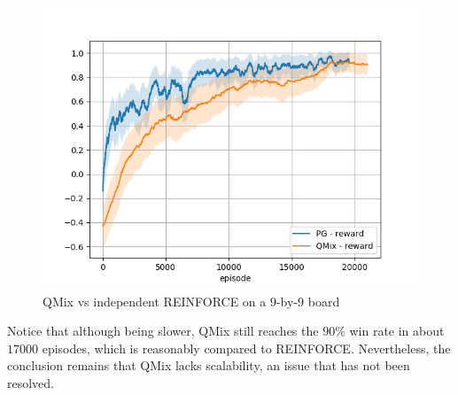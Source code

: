 \begin{figure}[htp]
    \centering
    \includegraphics[width=14cm]{images/experiment6/qmix_vs_pg_win_9.png}
    \caption{QMix vs independent REINFORCE on a 9-by-9 board}
    \label{fig:comp_qmix_pg2}
\end{figure}

Notice that although being slower, QMix still reaches the $90\%$ win rate in about $17000$ episodes, which is reasonably compared to REINFORCE. Nevertheless, the conclusion remains that QMix lacks scalability, an issue that has not been resolved.

